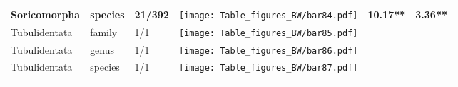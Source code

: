 \begin{longtable}{lL{1.8cm}C{2cm}lcc}
  \textbf{Soricomorpha} & \textbf{species} & \textbf{21/392} & \texttt{[image: Table\_figures\_BW/bar84.pdf]} & \textbf{10.17**} & \textbf{3.36**} \\ 
  Tubulidentata & family & 1/1 & \texttt{[image: Table\_figures\_BW/bar85.pdf]} &   &   \\ 
  Tubulidentata & genus & 1/1 & \texttt{[image: Table\_figures\_BW/bar86.pdf]} &   &   \\ 
  Tubulidentata & species & 1/1 & \texttt{[image: Table\_figures\_BW/bar87.pdf]} &   &   \\ 
   \hline
\hline
\label{Table_results}
\end{longtable}
